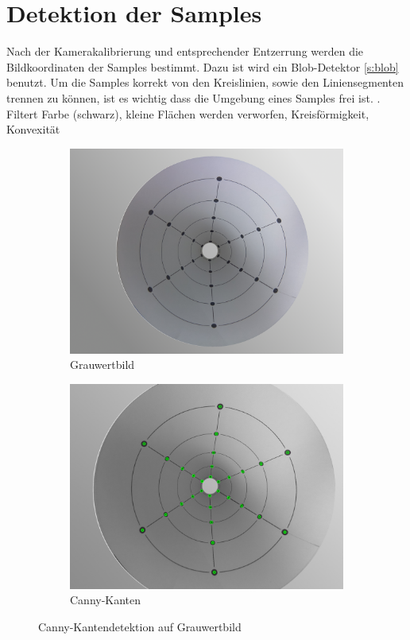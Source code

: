 \section{Detektion der Samples} 

Nach der Kamerakalibrierung und entsprechender Entzerrung werden die Bildkoordinaten der Samples bestimmt. Dazu ist wird ein Blob-Detektor \ref{s:blob} benutzt. Um die Samples korrekt von den Kreislinien, sowie den Liniensegmenten trennen zu können, ist es wichtig dass die Umgebung eines Samples frei ist. .
Filtert Farbe (schwarz), kleine Flächen werden verworfen, Kreisförmigkeit, Konvexität

\begin{figure}[!htb]
	\centering
	\begin{subfigure}{.5\textwidth}
		\centering
		\includegraphics[width=.9\textwidth]{images/coneRasp.jpg}
		\caption{Grauwertbild}
		\label{fig:beforeCanny}
	\end{subfigure}%
	\begin{subfigure}{.5\textwidth}
		\centering
		\includegraphics[width=.9\textwidth]{images/coneRaspDetectedDots.png}
		\caption{Canny-Kanten}
		\label{fig:afterCanny}
	\end{subfigure}
	\caption{Canny-Kantendetektion auf Grauwertbild}
	\label{fig:canny}
\end{figure}


